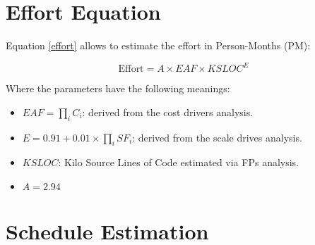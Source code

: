 \section{Effort Equation}
Equation \ref{effort} allows to estimate the effort in Person-Months (PM):

\begin{equation}
    \textrm{Effort} = A \times EAF \times KSLOC^E
    \label{effort}
\end{equation}

Where the parameters have the following meanings:
\begin{itemize}
    \item $EAF = \prod_i C_i$: derived from the cost drivers analysis.
    \item $E=0.91 + 0.01 \times \prod_{i}SF_i$: derived from the scale drives analysis.
    \item $KSLOC$: Kilo Source Lines of Code estimated via FPs analysis.
    \item $A=2.94$
\end{itemize}

\section{Schedule Estimation}